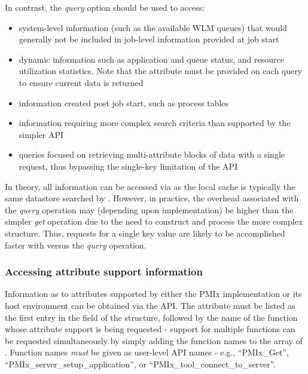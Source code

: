 In contrast, the \emph{query} option should be used to access:

\begin{itemize}
\item system-level information (such as the available \ac{WLM} queues) that would generally not be included in job-level information provided at job start
\item dynamic information such as application and queue status, and resource utilization statistics. Note that the  attribute must be provided on each query to ensure current data is returned
\item information created post job start, such as process tables
\item information requiring more complex search criteria than supported by the simpler  \ac{API}
\item queries focused on retrieving multi-attribute blocks of data with a single request, thus bypassing the single-key limitation of the  \ac{API}
\end{itemize}

In theory, all information can be accessed via  as the local cache is typically the same datastore searched by . However, in practice, the overhead associated with the \emph{query} operation may (depending upon implementation) be higher than the simpler \emph{get} operation due to the need to construct and process the more complex  structure. Thus, requests for a single key value are likely to be accomplished faster with  versus the \emph{query} operation.

\subsubsection{Accessing attribute support information}
\label{chap:api_job_mgmt:queryattrs}

Information as to attributes supported by either the \ac{PMIx} implementation or its host environment can be obtained via the  \ac{API}. The  attribute must be listed as the first entry in the  field of the  structure, followed by the name of the function whose attribute support is being requested - support for multiple functions can be requested simultaneously by simply adding the function names to the array of . Function names \emph{must} be given as user-level \ac{API} names - e.g., ``PMIx_Get'', ``PMIx_server_setup_application'', or ``PMIx_tool_connect_to_server''.

